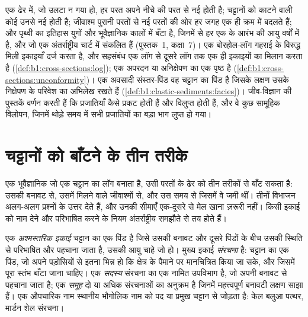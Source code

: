 \begin{recall}
एक ढेर में, जो उलटा न गया हो, हर परत अपने नीचे की परत से नई होती है; चट्टानों को काटने वाली कोई  उनसे नई होती है; जीवाश्म पुरानी परतों से नई परतों की ओर हर जगह एक ही क्रम में बदलते हैं; और पृथ्वी का इतिहास युगों और भूवैज्ञानिक कालों में बँटा है, जिनमें से हर एक के आरंभ की आयु वर्षों में है, और जो एक अंतर्राष्ट्रीय चार्ट में संकलित हैं (पुस्तक~1, कक्षा~7)। एक बोरहोल-लॉग गहराई के विरुद्ध मिली इकाइयाँ दर्ज करता है, और सहसंबंध एक लॉग से दूसरे लॉग तक एक ही इकाइयों का मिलान करता है (\cref{def:b1:cross-sections:log}); एक  अपरदन या अनिक्षेपण का एक पृष्ठ है (\cref{def:b1:cross-sections:unconformity})। एक अवसादी संस्तर-पिंड वह चट्टान का पिंड है जिसके लक्षण उसके निक्षेपण के परिवेश का अभिलेख रखते हैं (\cref{def:b1:clastic-sediments:facies})। जीव-विज्ञान की पुस्तकें वर्णन करती हैं कि प्रजातियाँ कैसे प्रकट होती हैं और विलुप्त होती हैं, और वे कुछ सामूहिक विलोपन, जिनमें थोड़े समय में सभी प्रजातियों का बड़ा भाग लुप्त हो गया।
\end{recall}

\section{चट्टानों को बाँटने के तीन तरीके}\label{sec:b1:stratigraphic-scale:three}

एक भूवैज्ञानिक जो एक चट्टान का लॉग बनाता है, उसी परतों के ढेर को तीन तरीकों से बाँट सकता है: उसकी बनावट से, उसमें मिलने वाले जीवाश्मों से, और उस समय से जिसमें वे जमी थीं। तीनों विभाजन अलग-अलग प्रश्नों के उत्तर देते हैं, और उनकी सीमाएँ एक-दूसरे से मेल खाना ज़रूरी नहीं। किसी इकाई को नाम देने और परिभाषित करने के नियम अंतर्राष्ट्रीय समझौते से तय होते हैं।

\begin{definition}\label{def:b1:stratigraphic-scale:lithostratigraphy}
एक \emph{अश्मस्तरिक इकाई} चट्टान का एक पिंड है जिसे उसकी बनावट और दूसरे पिंडों के बीच उसकी स्थिति से परिभाषित और पहचाना जाता है, उसकी आयु चाहे जो हो। मुख्य इकाई \emph{संरचना} है: चट्टान का एक पिंड, जो अपने पड़ोसियों से इतना भिन्न हो कि क्षेत्र के पैमाने पर मानचित्रित किया जा सके, और जिसमें पूरा स्तंभ बाँटा जाना चाहिए। एक \emph{सदस्य} संरचना का एक नामित उपविभाग है, जो अपनी बनावट से पहचाना जाता है; एक \emph{समूह} दो या अधिक संरचनाओं का अनुक्रम है जिनमें महत्त्वपूर्ण बनावटी लक्षण साझा हैं। एक औपचारिक नाम स्थानीय भौगोलिक नाम को पद या प्रमुख चट्टान से जोड़ता है: केल बलुआ पत्थर, मार्डन शेल संरचना।
\end{definition}

